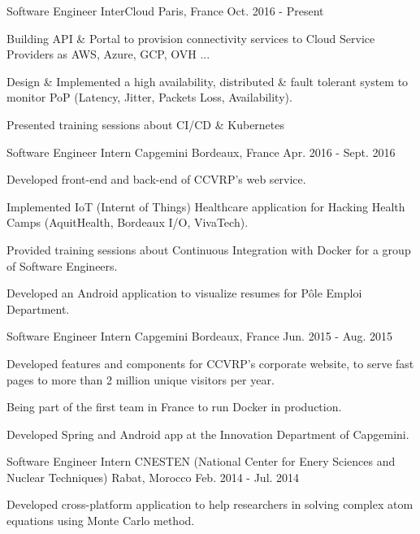 \begin{cventries}
  \cventry
    {Software Engineer}
    {InterCloud}
    {Paris, France}
    {Oct. 2016 - Present}
    {
      \begin{cvitems}
        \item {Building API \& Portal to provision connectivity services to Cloud Service Providers as AWS, Azure, GCP, OVH ...}
         \item {Design \& Implemented a high availability, distributed \& fault tolerant system to monitor PoP (Latency, Jitter, Packets Loss, Availability).}
         \item {Presented training sessions about CI/CD \& Kubernetes}
      \end{cvitems}
    }
    \cventry
    {Software Engineer Intern}
    {Capgemini}
    {Bordeaux, France}
    {Apr. 2016 - Sept. 2016}
    {
      \begin{cvitems}
        \item {Developed front-end and back-end of CCVRP's web service.}
         \item {Implemented IoT (Internt of Things) Healthcare application for Hacking Health Camps (AquitHealth, Bordeaux I/O, VivaTech).}
         \item {Provided training sessions about Continuous Integration with Docker for a group of Software Engineers.}
         \item {Developed an Android application to visualize resumes for Pôle Emploi Department.}
      \end{cvitems}
    }
    \cventry
    {Software Engineer Intern}
    {Capgemini}
    {Bordeaux, France}
    {Jun. 2015 - Aug. 2015}
    {
      \begin{cvitems}
        \item {Developed features and components for CCVRP's corporate website, to serve fast pages to more than 2 million unique visitors per year.}
         \item {Being part of the first team in France to run Docker in production.}
         \item {Developed Spring and Android app at the Innovation Department of Capgemini.}
      \end{cvitems}
    }
    \cventry
    {Software Engineer Intern}
    {CNESTEN (National Center for Enery Sciences and Nuclear Techniques)}
    {Rabat, Morocco}
    {Feb. 2014 - Jul. 2014}
    {
      \begin{cvitems}
        \item {Developed cross-platform application to help researchers in solving complex atom equations using Monte Carlo method.}
      \end{cvitems}
    }
\end{cventries}
